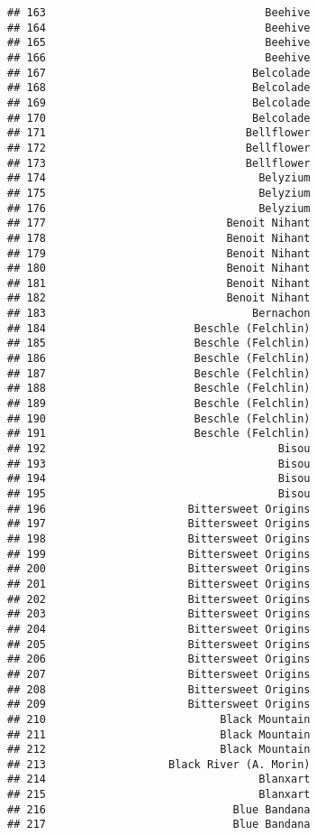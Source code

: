 \documentclass[
]{article}
\begin{document}
\begin{verbatim}
## 163                                  Beehive
## 164                                  Beehive
## 165                                  Beehive
## 166                                  Beehive
## 167                                Belcolade
## 168                                Belcolade
## 169                                Belcolade
## 170                                Belcolade
## 171                               Bellflower
## 172                               Bellflower
## 173                               Bellflower
## 174                                 Belyzium
## 175                                 Belyzium
## 176                                 Belyzium
## 177                            Benoit Nihant
## 178                            Benoit Nihant
## 179                            Benoit Nihant
## 180                            Benoit Nihant
## 181                            Benoit Nihant
## 182                            Benoit Nihant
## 183                                Bernachon
## 184                       Beschle (Felchlin)
## 185                       Beschle (Felchlin)
## 186                       Beschle (Felchlin)
## 187                       Beschle (Felchlin)
## 188                       Beschle (Felchlin)
## 189                       Beschle (Felchlin)
## 190                       Beschle (Felchlin)
## 191                       Beschle (Felchlin)
## 192                                    Bisou
## 193                                    Bisou
## 194                                    Bisou
## 195                                    Bisou
## 196                      Bittersweet Origins
## 197                      Bittersweet Origins
## 198                      Bittersweet Origins
## 199                      Bittersweet Origins
## 200                      Bittersweet Origins
## 201                      Bittersweet Origins
## 202                      Bittersweet Origins
## 203                      Bittersweet Origins
## 204                      Bittersweet Origins
## 205                      Bittersweet Origins
## 206                      Bittersweet Origins
## 207                      Bittersweet Origins
## 208                      Bittersweet Origins
## 209                      Bittersweet Origins
## 210                           Black Mountain
## 211                           Black Mountain
## 212                           Black Mountain
## 213                   Black River (A. Morin)
## 214                                 Blanxart
## 215                                 Blanxart
## 216                             Blue Bandana
## 217                             Blue Bandana

\end{verbatim}
\end{document}
